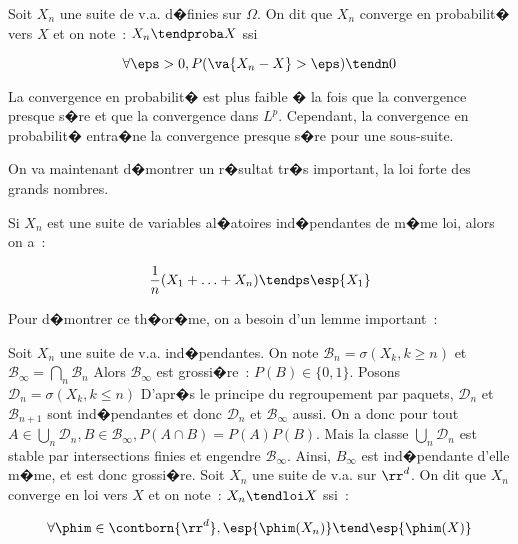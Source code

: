 Soit $X_n$ une suite de v.a. d�finies sur $\Omega$. On dit que $X_n$ converge en probabilit� vers $X$ et on note~: 
$X_n \tendproba X$ ssi\par
$$\forall\eps>0, P(\va{X_n-X}>\eps)\tendn 0$$\par
La convergence en probabilit� est plus faible � la fois que la convergence presque s�re et que la convergence dans $L^p$. Cependant, 
la convergence en probabilit� entra�ne la convergence presque s�re pour une sous-suite.\par
On va maintenant d�montrer un r�sultat tr�s important, la loi forte des grands nombres.\par
{}
Si $X_n$ est une suite de variables al�atoires ind�pendantes de m�me loi, alors on a~:\par
$$\frac{1}{n}(X_1 + \ldots + X_n) \tendps \esp{X_1}$$\par
Pour d�montrer ce th�or�me, on a besoin d'un lemme important~:\par
{}
Soit $X_n$ une suite de v.a. ind�pendantes. On note $\mathcal{B}_n = \sigma(X_k, k\geq n)$ et $\mathcal{B}_{\infty} = \bigcap_n 
\mathcal{B}_n$ Alors $\mathcal{B}_{\infty}$ est grossi�re~: $P(B)\in \lbrace 0, 1\rbrace$.
\dem Posons $\mathcal{D}_n = \sigma(X_k, k\leq n)$ D'apr�s le principe du regroupement par paquets, $\mathcal{D}_n$ et 
$\mathcal{B}_{n+1}$ sont ind�pendantes et donc $\mathcal{D}_n$ et $\mathcal{B}_{\infty}$ aussi. On a donc pour tout 
$A\in \bigcup_n\mathcal{D}_n, B\in \mathcal{B}_{\infty}, P(A\cap B) = P(A)P(B)$. Mais la classe $\bigcup_n\mathcal{D}_n$ est stable par 
intersections finies et engendre $\mathcal{B}_{\infty}$. Ainsi, $B_{\infty}$ est ind�pendante d'elle m�me, et est donc grossi�re.
Soit $X_n$ une suite de v.a. sur ${\rr}^d$. On dit que $X_n$ converge en loi vers $X$ et on note~: $X_n\tendloi X$ ssi~:\par
$$\forall \phim\in\contborn{{\rr}^d}, \esp{\phim(X_n)}\tend \esp{\phim(X)}$$\par



